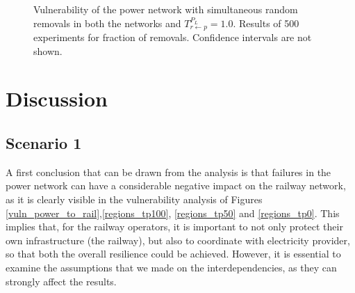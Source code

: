 \documentclass[review]{elsarticle}
\begin{document}
\begin{figure}[h]
	\centering
	\caption{Vulnerability of the power network with simultaneous random removals in both the networks and $T_{r \leftarrow p}^{P_L}=1.0$. Results of 500 experiments for fraction of removals. Confidence intervals are not shown.}
	\label{vuln_power_ccf_100}
\end{figure}


\section{Discussion}
\subsection{Scenario 1}
	A first conclusion that can be drawn from the analysis is that failures in the power network can have a considerable negative impact on the railway network, as it is clearly visible in the vulnerability analysis of Figures \ref{vuln_power_to_rail},\ref{regions_tp100}, \ref{regions_tp50} and \ref{regions_tp0}. This implies that, for the railway operators, it is important to not only protect their own infrastructure (the railway), but also to coordinate with electricity provider, so that both the overall resilience could be achieved. However, it is essential to examine the assumptions that we made on the interdependencies, as they can strongly affect the results.
	
\end{document}
